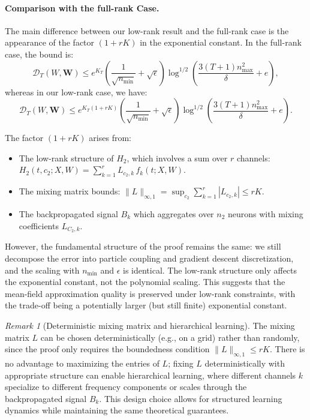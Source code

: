 \documentclass[nohyperref]{article}
\theoremstyle{plain}
\theoremstyle{definition}
\theoremstyle{remark}
\newtheorem{remark}[theorem]{Remark}
\begin{document}
\paragraph*{Comparison with the full-rank Case.}
The main difference between our low-rank result and the full-rank case \cite{nguyen2020global} is the appearance of the factor $(1+rK)$ in the exponential constant. In the full-rank case, the bound is:
\[
\mathscr{D}_T(W, \mathbf{W}) \le e^{K_T}\left(\frac{1}{\sqrt{n_{\min}}} + \sqrt{\epsilon}\right)\log^{1/2}\left(\frac{3(T+1)n_{\max}^2}{\delta} + e\right),
\]
whereas in our low-rank case, we have:
\[
\mathscr{D}_T(W, \mathbf{W}) \le e^{K_T(1+rK)}\left(\frac{1}{\sqrt{n_{\min}}} + \sqrt{\epsilon}\right)\log^{1/2}\left(\frac{3(T+1)n_{\max}^2}{\delta} + e\right).
\]

The factor $(1+rK)$ arises from:
\begin{itemize}
\item The low-rank structure of $H_2$, which involves a sum over $r$ channels: $H_2(t, c_2; X, W) = \sum_{k=1}^r L_{c_2,k}\,f_k(t; X, W)$.
\item The mixing matrix bounds: $\|L\|_{\infty,1} = \sup_{c_2}\sum_{k=1}^r |L_{c_2,k}| \le rK$.
\item The backpropagated signal $B_k$ which aggregates over $n_2$ neurons with mixing coefficients $L_{C_2,k}$.
\end{itemize}

However, the fundamental structure of the proof remains the same: we still decompose the error into particle coupling and gradient descent discretization, and the scaling with $n_{\min}$ and $\epsilon$ is identical. The low-rank structure only affects the exponential constant, not the polynomial scaling. This suggests that the mean-field approximation quality is preserved under low-rank constraints, with the trade-off being a potentially larger (but still finite) exponential constant.

\begin{remark}[Deterministic mixing matrix and hierarchical learning]
\label{rem:deterministic-L}
The mixing matrix $L$ can be chosen deterministically (e.g., on a grid) rather than randomly, since the proof only requires the boundedness condition $\|L\|_{\infty,1} \le rK$. There is no advantage to maximizing the entries of $L$; fixing $L$ deterministically with appropriate structure can enable hierarchical learning, where different channels $k$ specialize to different frequency components or scales through the backpropagated signal $B_k$. This design choice allows for structured learning dynamics while maintaining the same theoretical guarantees.
\end{remark}
\end{document}

